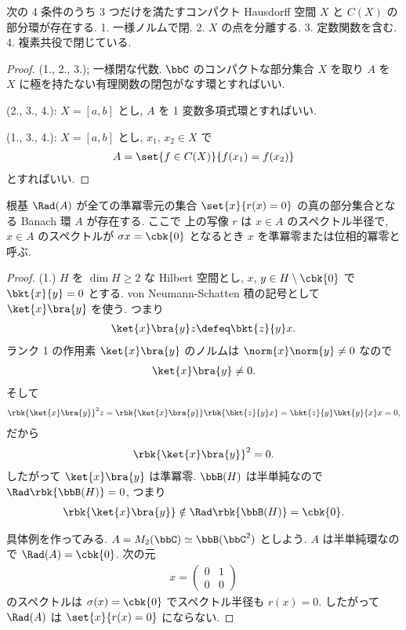 \documentclass[openany, a4paper, oneside]{jsbook}
\begin{document}
\begin{ex}
次の 4 条件のうち 3 つだけを満たすコンパクト Hausdorff 空間 $X$ と $C(X)$ の部分環が存在する.
1. 一様ノルムで閉.
2. $X$ の点を分離する.
3. 定数関数を含む.
4. 複素共役で閉じている.
\end{ex}
\begin{proof}
(1., 2., 3.); 一様閉な代数.
$\bbC$ のコンパクトな部分集合 $X$ を取り $A$ を $X$ に極を持たない有理関数の閉包がなす環とすればいい.

(2., 3., 4.):
$X = [a, b]$ とし, $A$ を 1 変数多項式環とすればいい.

(1., 3., 4.):
$X = [a, b]$ とし, $x_1$, $x_2 \in X$ で
\begin{align}
 A
 =
 \set{f \in C(X)}{f(x_1) = f(x_2)}
\end{align}
とすればいい.
\end{proof}

\begin{ex}
根基 $\Rad (A)$ が全ての準冪零元の集合 $\set{x}{r(x) = 0}$ の真の部分集合となる Banach 環 $A$ が存在する.
ここで 上の写像 $r$ は $x \in A$ のスペクトル半径で,
$x \in A$ のスペクトルが $\sigma x = \cbk{0}$ となるとき $x$ を準冪零または位相的冪零と呼ぶ.
\end{ex}
\begin{proof}
(1.) $H$ を $\dim H \geq 2$ な Hilbert 空間とし,
$x$, $y \in H \setminus \cbk{0}$ で $\bkt{x}{y} = 0$ とする.
von Neumann-Schatten 積の記号として $\ket{x} \bra{y}$ を使う.
つまり
\begin{align}
 \ket{x} \bra{y} z
 \defeq
 \bkt{z}{y} x.
\end{align}
ランク 1 の作用素 $\ket{x} \bra{y}$ のノルムは $\norm{x} \norm{y} \neq 0$ なので
\begin{align}
 \ket{x} \bra{y}
 \neq 0.
\end{align}
そして
\begin{align}
 \rbk{\ket{x} \bra{y}}^2 z
 =
 \rbk{\ket{x} \bra{y}} \rbk{\bkt{z}{y} x}
 =
 \bkt{z}{y} \bkt{y}{x} x
 = 0,
\end{align}
だから
\begin{align}
 \rbk{\ket{x} \bra{y}}^2
 = 0.
\end{align}
したがって $\ket{x} \bra{y}$ は準冪零.
$\bbB (H)$ は半単純なので $\Rad \rbk{\bbB (H)} = 0$, つまり
\begin{align}
 \rbk{\ket{x} \bra{y}} \notin \Rad \rbk{\bbB (H)}
 =
 \cbk{0}.
\end{align}

具体例を作ってみる.
$A = M_2 (\bbC) \simeq \bbB (\bbC^2)$ としよう.
$A$ は半単純環なので $\Rad (A) = \cbk{0}$.
次の元
\begin{align}
 x
 =
 \begin{pmatrix}
  0 & 1 \\
  0 & 0
 \end{pmatrix}
\end{align}
のスペクトルは $\sigma (x) = \cbk{0}$ でスペクトル半径も $r(x) = 0$.
したがって $\Rad (A)$ は $\set{x}{r(x) = 0}$ にならない.
\end{proof}
\end{document}
